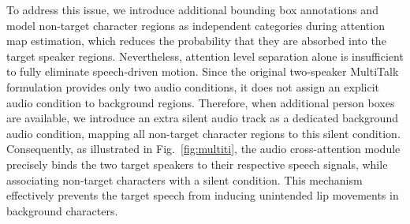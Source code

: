 To address this issue, we introduce additional bounding box annotations and model non-target character regions as independent categories during attention map estimation, which reduces the probability that they are absorbed into the target speaker regions. Nevertheless, attention level separation alone is insufficient to fully eliminate speech-driven motion. Since the original two-speaker MultiTalk formulation provides only two audio conditions, it does not assign an explicit audio condition to background regions. Therefore, when additional person boxes are available, we introduce an extra silent audio track as a dedicated background audio condition, mapping all non-target character regions to this silent condition. Consequently, as illustrated in Fig.~\ref{fig:multiti}, the audio cross-attention module precisely binds the two target speakers to their respective speech signals, while associating non-target characters with a silent condition. This mechanism effectively prevents the target speech from inducing unintended lip movements in background characters.




